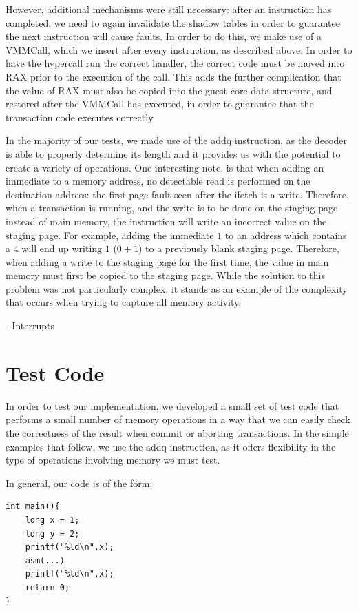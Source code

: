\documentclass{acm_proc_article-sp}
\begin{document}
However, additional mechanisms were still necessary: after an instruction has
completed, we need to again invalidate the shadow tables in order to guarantee 
the next instruction will cause faults. In order to do this, we make use of a 
VMMCall, which we insert after every instruction, as described above. In order
to have the hypercall run the correct handler, the correct code must be moved
into RAX prior to the execution of the call. This adds the further complication
that the value of RAX must also be copied into the guest core data structure,
and restored after the VMMCall has executed, in order to guarantee that the 
transaction code executes correctly.  

In the majority of our tests, we made use of the addq instruction, as the 
decoder is able to properly determine its length and it provides us with the
potential to create a variety of operations. One interesting note, is that when
adding an immediate to a memory address, no detectable read is performed on
the destination address: the first page fault seen after the ifetch is a write.
Therefore, when a transaction is running, and the write is to be done on the
staging page instead of main memory, the instruction will write an incorrect
value on the staging page. For example, adding the immediate $1$ to an address
which contains a $4$ will end up writing $1$ ($0+1$) to a previously blank
staging page. Therefore, when adding a write to the staging page for the first
time, the value in main memory must first be copied to the staging page. While
the solution to this problem was not particularly complex, it stands as an 
example of the complexity that occurs when trying to capture all memory 
activity.
 
- Interrupts

\section{Test Code}

In order to test our implementation, we developed a small set of test code that
performs a small number of memory operations in a way that we can easily check
the correctness of the result when commit or aborting transactions. 
In the simple examples that follow, we use the addq instruction, as it
offers flexibility in the type of operations involving memory we must test.

In general, our code is of the form:
\begin{verbatim}
int main(){
    long x = 1;
    long y = 2;
    printf("%ld\n",x);  
    asm(...)
    printf("%ld\n",x);  
    return 0;
}
\end{verbatim} 
\end{document}

